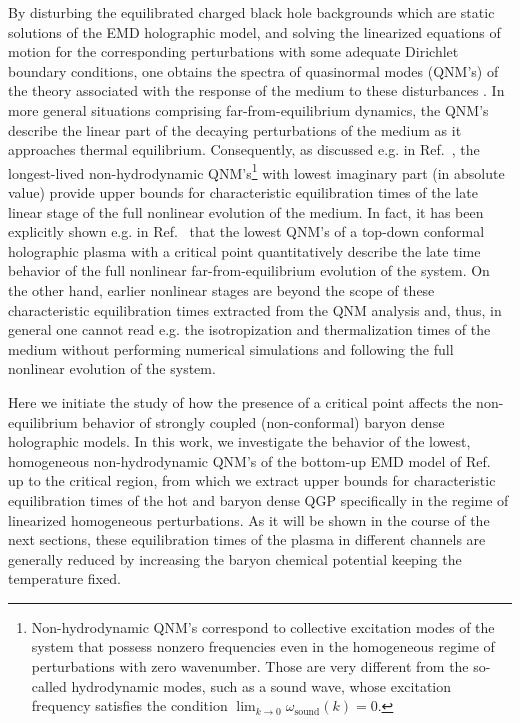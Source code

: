 \documentclass[aps,prd,showkeys,superscriptaddress,singlecolumn,nofootinbib,floatfix]{revtex4-1}
\begin{document}
By disturbing the equilibrated charged black hole backgrounds which are static solutions of the EMD holographic model, and solving the linearized equations of motion for the corresponding perturbations with some adequate Dirichlet boundary conditions, one obtains the spectra of quasinormal modes (QNM's) of the theory associated with the response of the medium to these disturbances \cite{Kovtun:2005ev,Berti:2009kk}. In more general situations comprising far-from-equilibrium dynamics, the QNM's describe the linear part of the decaying perturbations of the medium as it approaches thermal equilibrium. Consequently, as discussed e.g. in Ref.\ \cite{Horowitz:1999jd}, the longest-lived non-hydrodynamic QNM's\footnote{Non-hydrodynamic QNM's correspond to collective excitation modes of the system that possess nonzero frequencies even in the homogeneous regime of perturbations with zero wavenumber. Those are very different from the so-called hydrodynamic modes, such as a sound wave, whose excitation frequency satisfies the condition $\lim_{k\to 0}\omega_{\textrm{sound}}(k)=0$.} with lowest imaginary part (in absolute value) provide upper bounds for characteristic equilibration times of the late linear stage of the full nonlinear evolution of the medium. In fact, it has been explicitly shown e.g. in Ref.\ \cite{Critelli:2017euk} that the lowest QNM's of a top-down conformal holographic plasma with a critical point quantitatively describe the late time behavior of the full nonlinear far-from-equilibrium evolution of the system. On the other hand, earlier nonlinear stages are beyond the scope of these characteristic equilibration times extracted from the QNM analysis and, thus, in general one cannot read e.g. the isotropization and thermalization times of the medium without performing numerical simulations and following the full nonlinear evolution of the system.

Here we initiate the study of how the presence of a critical point affects the non-equilibrium behavior of strongly coupled (non-conformal) baryon dense holographic models. In this work, we investigate the behavior of the lowest, homogeneous non-hydrodynamic QNM's of the bottom-up EMD model of Ref.\ \cite{Critelli:2017oub} up to the critical region, from which we extract upper bounds for characteristic equilibration times of the hot and baryon dense QGP specifically in the regime of linearized homogeneous perturbations. As it will be shown in the course of the next sections, these equilibration times of the plasma in different channels are generally reduced by increasing the baryon chemical potential keeping the temperature fixed.
\end{document}
